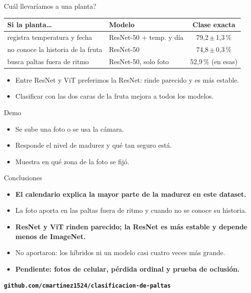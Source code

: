 \documentclass[aspectratio=169,11pt,table]{beamer}
\begin{document}
\begin{frame}{\textquestiondown{}Cuál llevaríamos a una planta?}\relax
{\small
\centering
\begin{tabular}{llc}
\toprule
\rowcolor{verdeosc}\color{white}\bfseries Si la planta\ldots{} & \color{white}\bfseries Modelo & \color{white}\bfseries Clase exacta \\
\midrule
\rowcolor{verdecla!22}registra temperatura y fecha & ResNet-50 + temp. y día & 79{,}2\,$\pm$\,1{,}3\,\% \\
no conoce la historia de la fruta & ResNet-50 & 74{,}8\,$\pm$\,0{,}3\,\% \\
busca paltas fuera de ritmo & ResNet-50, solo foto & 52{,}9\,\% (en esas) \\
\bottomrule
\end{tabular}
}
\vspace{0.8em}
{\small
\setlength{\itemsep}{0.4em}
\begin{itemize}
  \item Entre ResNet y ViT preferimos la ResNet: rinde parecido y es más estable.
  \item Clasificar con las dos caras de la fruta mejora a todos los modelos.
\end{itemize}
}
\end{frame}

\begin{frame}{Demo}\relax
{\large
\setlength{\itemsep}{0.9em}
\begin{itemize}
  \item Se sube una foto o se usa la cámara.
  \item Responde el nivel de madurez y qué tan seguro está.
  \item Muestra en qué zona de la foto se fijó.
\end{itemize}
}
\end{frame}

\begin{frame}{Conclusiones}\relax
{\small
\setlength{\itemsep}{0.55em}
\begin{itemize}
  \item {\bfseries El calendario explica la mayor parte de la madurez en este dataset.}
  \item La foto aporta en las paltas fuera de ritmo y cuando no se conoce su historia.
  \item {\bfseries ResNet y ViT rinden parecido; la ResNet es más estable y depende menos de ImageNet.}
  \item No aportaron: los híbridos ni un modelo casi cuatro veces más grande.
  \item {\bfseries Pendiente: fotos de celular, pérdida ordinal y prueba de oclusión.}
\end{itemize}
}
\vfill
{\normalsize\bfseries\color{verdeosc}\texttt{github.com/cmartinez1524/clasificacion-de-paltas}}
\end{frame}
\end{document}
